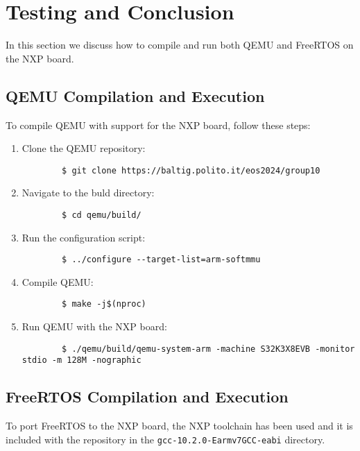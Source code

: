 \section{Testing and Conclusion}\label{sec:testing_conclusion}

In this section we discuss how to compile and run both QEMU and FreeRTOS on the NXP board.

\subsection{QEMU Compilation and Execution}

To compile QEMU with support for the NXP board, follow these steps:
\begin{enumerate}
    \item {Clone the QEMU repository:
    \begin{verbatim}
        $ git clone https://baltig.polito.it/eos2024/group10
      \end{verbatim}
    }
    \item {Navigate to the buld directory:
    \begin{verbatim}
        $ cd qemu/build/
      \end{verbatim}
    }
    \item {Run the configuration script:
    \begin{verbatim}
        $ ../configure --target-list=arm-softmmu
      \end{verbatim}
    }
    \item {Compile QEMU:
    \begin{verbatim}
        $ make -j$(nproc)
      \end{verbatim}
    }
    \item {Run QEMU with the NXP board:
    \begin{verbatim}
        $ ./qemu/build/qemu-system-arm -machine S32K3X8EVB -monitor stdio -m 128M -nographic
      \end{verbatim}
    }
\end{enumerate}

\subsection{FreeRTOS Compilation and Execution}

To port FreeRTOS to the NXP board, the NXP toolchain has been used and it is included with the repository in the \texttt{gcc-10.2.0-Earmv7GCC-eabi} directory.

